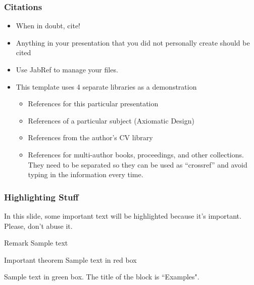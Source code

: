 \documentclass[aspectratio=169]{rubeamer}
\begin{document}
\begin{frame}
  \frametitle{Citations}
  \begin{itemize}
  \item When in doubt, cite!
  \item Anything in your presentation that you did not personally create should be cited
    \item Use JabRef to manage your  files.
  \item This template uses 4 separate libraries as a demonstration
    \begin{itemize}
    \item {} References for this particular presentation
    \item {} References of a particular subject (Axiomatic Design\cite{suh1990principles,suh2001axiomatic})
      \item {} References from the author's CV library
      \item {} References for multi-author books, proceedings, and other collections.
        They need to be separated so they can be used as ``crossref'' and avoid typing in the information every time.
    \end{itemize}
  \end{itemize}
\end{frame}

\begin{frame}
  \frametitle{Highlighting Stuff}
  
  In this slide, some important text will be
  \alert{highlighted} because it's important.
  Please, don't abuse it. \cite{overleaf:beamer}
  
  \begin{block}{Remark}
    Sample text
  \end{block}
  
  \begin{alertblock}{Important theorem}
    Sample text in red box
  \end{alertblock}
  
  \begin{examples}
    Sample text in green box. The title of the block is ``Examples".
  \end{examples}
\end{frame}
\end{document}
